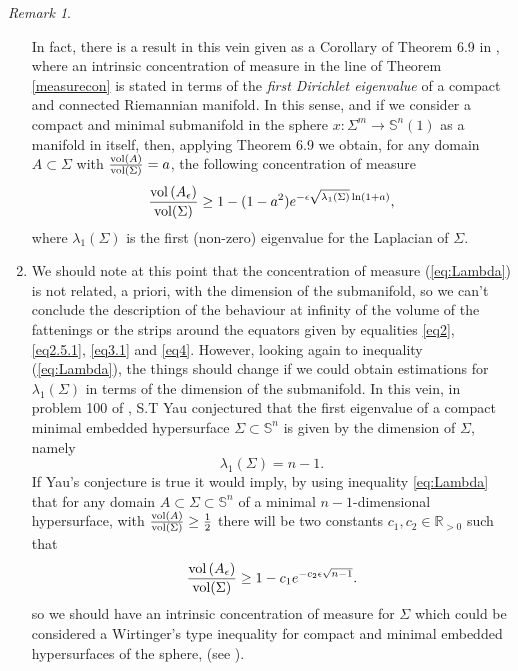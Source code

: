 \documentclass[11pt,letterpaper]{amsart}
\theoremstyle{definition}
\theoremstyle{remark}
\newtheorem{remark}[theorem]{Remark}
\newcommand{\ese}{\mathbb{S}}
\begin{document}
\begin{remark}
\begin{enumerate}
In fact, there is a result in this vein given as a Corollary of Theorem 6.9 in \cite{MS}, where an intrinsic concentration of measure in the line of Theorem \ref{measurecon} is stated in terms of the {\em first Dirichlet eigenvalue} of a compact and connected Riemannian manifold. In this sense, and if we consider a compact and minimal submanifold in the sphere $x:\Sigma^m \rightarrow \ese^n(1)$ as a manifold in itself, then, applying Theorem 6.9 we obtain, for any domain $A\subset \Sigma$ with $\frac{{\rm vol}(A)}{{\rm vol}( \Sigma)}=a$, the following concentration of measure
\begin{equation}\label{eq:Lambda}
   \frac{{\rm vol}\left(A_\epsilon\right)}{{\rm vol}( \Sigma)}\geq 1-(1-a^2)e^{-\epsilon\sqrt{\lambda_1(\Sigma)}\ln(1+a)}, 
\end{equation}
\noindent where $\lambda_1(\Sigma)$ is the first (non-zero) eigenvalue for the Laplacian of $\Sigma$.  
\medskip

\item We should note at this point that the concentration of measure (\ref{eq:Lambda}) is not related, a priori, with the dimension of the submanifold, so we can't conclude the description of the behaviour at infinity of the volume of the fattenings or the strips around the equators given by equalities \eqref{eq2}, \eqref{eq2.5.1}, \eqref{eq3.1} and \eqref{eq4}. However, looking again to inequality (\ref{eq:Lambda}), the things should change if we could obtain estimations for $\lambda_1(\Sigma)$ in terms of the dimension of the submanifold. In this vein, in problem 100 of \cite{YauMR0645728}, S.T Yau conjectured that the first eigenvalue of a compact minimal embedded hypersurface $\Sigma\subset \mathbb{S}^{n}$ is given by the dimension of $\Sigma$, namely
$$\lambda_1(\Sigma)=n-1.$$
If  Yau's conjecture is true it would  imply, by using inequality \eqref{eq:Lambda} that for any domain $A\subset \Sigma\subset \mathbb{S}^{n}$  of a minimal $n-1$-dimensional hypersurface, with 
 $\frac{{\rm vol}(A)}{{\rm vol}( \Sigma)}\geq \frac{1}{2}$ there will be two constants $c_1,c_2\in \mathbb{R}_{>0}$ such that
 \begin{equation}\label{eq:yau1}
   \frac{{\rm vol}\left(A_\epsilon\right)}{{\rm vol}( \Sigma)}\geq 1-c_1e^{-c_2\epsilon\sqrt{n-1}}. 
\end{equation}
\noindent so we should have an intrinsic concentration of measure for $\Sigma$ which could be considered a Wirtinger's type inequality for compact and minimal embedded hypersurfaces of the sphere, (see \cite{Gromov}).


\end{enumerate}
\end{remark}
\end{document}
